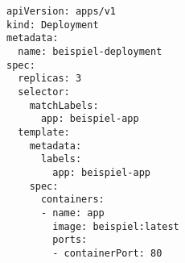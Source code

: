 \begin{verbatim}
apiVersion: apps/v1
kind: Deployment
metadata:
  name: beispiel-deployment
spec:
  replicas: 3
  selector:
    matchLabels:
      app: beispiel-app
  template:
    metadata:
      labels:
        app: beispiel-app
    spec:
      containers:
      - name: app
        image: beispiel:latest
        ports:
        - containerPort: 80
\end{verbatim}